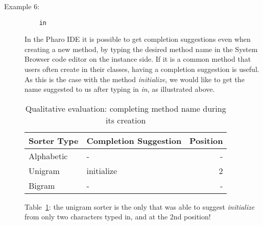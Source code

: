 \begin{description}
\item [Example 6:] \hfill
\begin{lstlisting}
    in
\end{lstlisting}
In the Pharo IDE it is possible to get completion suggestions even when creating a new method, by typing the desired method name in the System Browser code editor on the instance side. If it is a common method that users often create in their classes, having a completion suggestion is useful. As this is the case with the method \textit{initialize}, we would like to get the name suggested to us after typing in \textit{in}, as illustrated above.
\begin{table}[H]
    \centering
    \begin{tabular}{llr}
    \hline
    \textbf{Sorter Type} & \textbf{Completion Suggestion} & \textbf{Position} \\ \hline
    Alphabetic & - & - \\ \hline
    Unigram & initialize & 2 \\ \hline
    Bigram & - & - \\ \hline
    \end{tabular}
\caption{Qualitative evaluation: completing method name during its creation}
\label{table:qual6}
\end{table}
Table~\ref{table:qual6}: the unigram sorter is the only that was able to suggest \textit{initialize} from only two characters typed in, and at the 2nd position!


\end{description}
